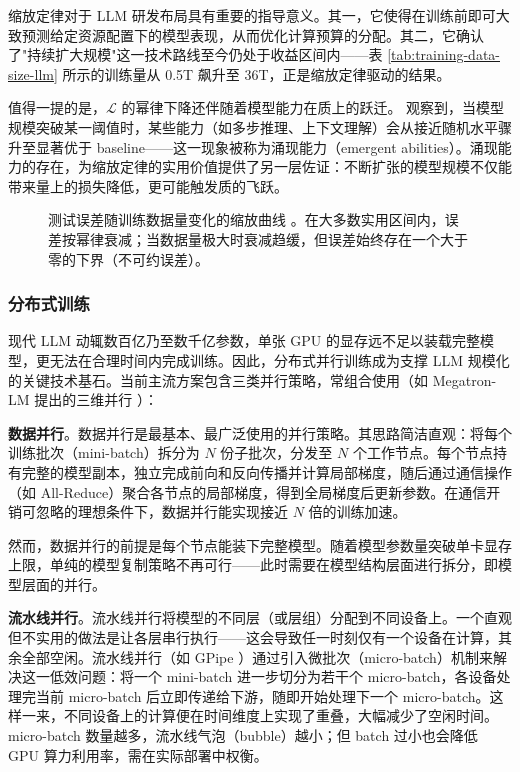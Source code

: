 缩放定律对于 LLM 研发布局具有重要的指导意义。其一，它使得在训练前即可大致预测给定资源配置下的模型表现，从而优化计算预算的分配。其二，它确认了"持续扩大规模"这一技术路线至今仍处于收益区间内——表 \ref{tab:training-data-size-llm} 所示的训练量从 0.5T 飙升至 36T，正是缩放定律驱动的结果。

值得一提的是，$\mathcal{L}$ 的幂律下降还伴随着模型能力在质上的跃迁。\cite{wei-etal:2022emergent} 观察到，当模型规模突破某一阈值时，某些能力（如多步推理、上下文理解）会从接近随机水平骤升至显著优于 baseline——这一现象被称为涌现能力（emergent abilities）。涌现能力的存在，为缩放定律的实用价值提供了另一层佐证：不断扩张的模型规模不仅能带来量上的损失降低，更可能触发质的飞跃。

\begin{figure}[!t]
\centering

\caption{测试误差随训练数据量变化的缩放曲线 \cite{hestness-etal:2017deep}。在大多数实用区间内，误差按幂律衰减；当数据量极大时衰减趋缓，但误差始终存在一个大于零的下界（不可约误差）。}
\label{fig:scaling-power-law-curve}
\end{figure}

\subsubsection{分布式训练}
\label{sec:llm-distributed-training}

现代 LLM 动辄数百亿乃至数千亿参数，单张 GPU 的显存远不足以装载完整模型，更无法在合理时间内完成训练。因此，分布式并行训练成为支撑 LLM 规模化的关键技术基石。当前主流方案包含三类并行策略，常组合使用（如 Megatron-LM 提出的三维并行 \cite{narayanan-etal:2021efficient}）：

\medskip
\noindent\textbf{数据并行}。数据并行是最基本、最广泛使用的并行策略。其思路简洁直观：将每个训练批次（mini-batch）拆分为 $N$ 份子批次，分发至 $N$ 个工作节点。每个节点持有完整的模型副本，独立完成前向和反向传播并计算局部梯度，随后通过通信操作（如 All-Reduce）聚合各节点的局部梯度，得到全局梯度后更新参数。在通信开销可忽略的理想条件下，数据并行能实现接近 $N$ 倍的训练加速。

然而，数据并行的前提是每个节点能装下完整模型。随着模型参数量突破单卡显存上限，单纯的模型复制策略不再可行——此时需要在模型结构层面进行拆分，即模型层面的并行。

\medskip
\noindent\textbf{流水线并行}。流水线并行将模型的不同层（或层组）分配到不同设备上。一个直观但不实用的做法是让各层串行执行——这会导致任一时刻仅有一个设备在计算，其余全部空闲。流水线并行（如 GPipe \cite{huang-etal:2019gpipe}）通过引入微批次（micro-batch）机制来解决这一低效问题：将一个 mini-batch 进一步切分为若干个 micro-batch，各设备处理完当前 micro-batch 后立即传递给下游，随即开始处理下一个 micro-batch。这样一来，不同设备上的计算便在时间维度上实现了重叠，大幅减少了空闲时间。micro-batch 数量越多，流水线气泡（bubble）越小；但 batch 过小也会降低 GPU 算力利用率，需在实际部署中权衡。

